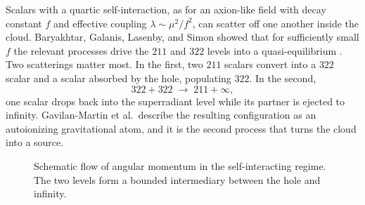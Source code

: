 \documentclass[11pt]{article}
\begin{document}
Scalars with a quartic self-interaction, as for an axion-like field with decay constant $f$ and effective coupling $\lambda \sim \mu^{2}/f^{2}$, can scatter off one another inside the cloud. Baryakhtar, Galanis, Lasenby, and Simon showed that for sufficiently small $f$ the relevant processes drive the $211$ and $322$ levels into a quasi-equilibrium \cite{Baryakhtar2021}. Two scatterings matter most. In the first, two $211$ scalars convert into a $322$ scalar and a scalar absorbed by the hole, populating $322$. In the second,
\begin{equation}
322 + 322 \;\longrightarrow\; 211 + \infty ,
\label{eq:ionize}
\end{equation}
one scalar drops back into the superradiant level while its partner is ejected to infinity. Gavilan-Martin et al.\ describe the resulting configuration as an autoionizing gravitational atom, and it is the second process that turns the cloud into a source.

\begin{figure}[h]
\centering
{}
\caption{Schematic flow of angular momentum in the self-interacting regime. The two levels form a bounded intermediary between the hole and infinity.}
\end{figure}
\end{document}
